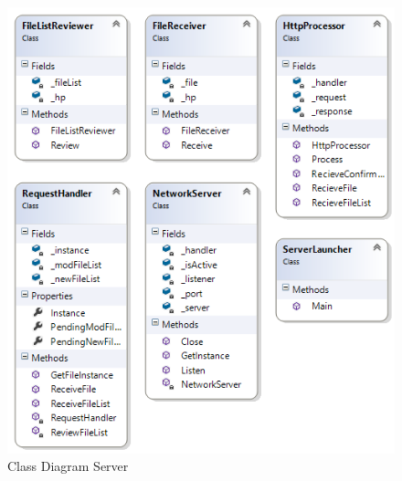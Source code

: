 \begin{figure}[H]
  \includegraphics[width=\textwidth]{illustrations/classDiagrams/serverCD.png}
  \caption{Class Diagram Server}
  \label{classdiagramserver}
\end{figure}
